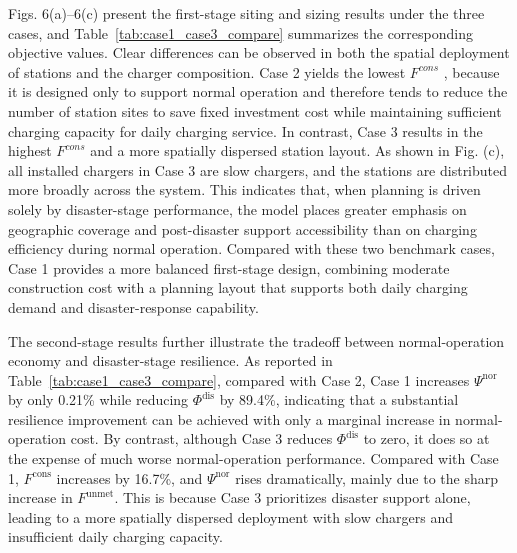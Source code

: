 \documentclass[journal]{IEEEtran}
\providecommand{\1}{\mathbf{1}}
\begin{document}
Figs. 6(a)–6(c) present the first-stage siting and sizing results under the three cases, and Table~\ref{tab:case1_case3_compare} summarizes the corresponding objective values. Clear differences can be observed in both the spatial deployment of stations and the charger composition. Case 2 yields the lowest 
$F^{cons}$
, because it is designed only to support normal operation and therefore tends to reduce the number of station sites to save fixed investment cost while maintaining sufficient charging capacity for daily charging service. In contrast, Case 3 results in the highest $F^{cons}$ and a more spatially dispersed station layout. As shown in Fig.  (c), all installed chargers in Case 3 are slow chargers, and the stations are distributed more broadly across the system. This indicates that, when planning is driven solely by disaster-stage performance, the model places greater emphasis on geographic coverage and post-disaster support accessibility than on charging efficiency during normal operation. Compared with these two benchmark cases, Case 1 provides a more balanced first-stage design, combining moderate construction cost with a planning layout that supports both daily charging demand and disaster-response capability.

The second-stage results further illustrate the tradeoff between normal-operation economy and disaster-stage resilience. As reported in Table~\ref{tab:case1_case3_compare}, compared with Case 2, Case 1 increases $\Psi^{\mathrm{nor}}$ by only 0.21\% while reducing $\Phi^{\mathrm{dis}}$ by 89.4\%, indicating that a substantial resilience improvement can be achieved with only a marginal increase in normal-operation cost. By contrast, although Case 3 reduces $\Phi^{\mathrm{dis}}$ to zero, it does so at the expense of much worse normal-operation performance. Compared with Case 1, $F^{\mathrm{cons}}$ increases by 16.7\%, and $\Psi^{\mathrm{nor}}$ rises dramatically, mainly due to the sharp increase in $F^{\mathrm{unmet}}$. This is because Case 3 prioritizes disaster support alone, leading to a more spatially dispersed deployment with slow chargers and insufficient daily charging capacity.
\end{document}

